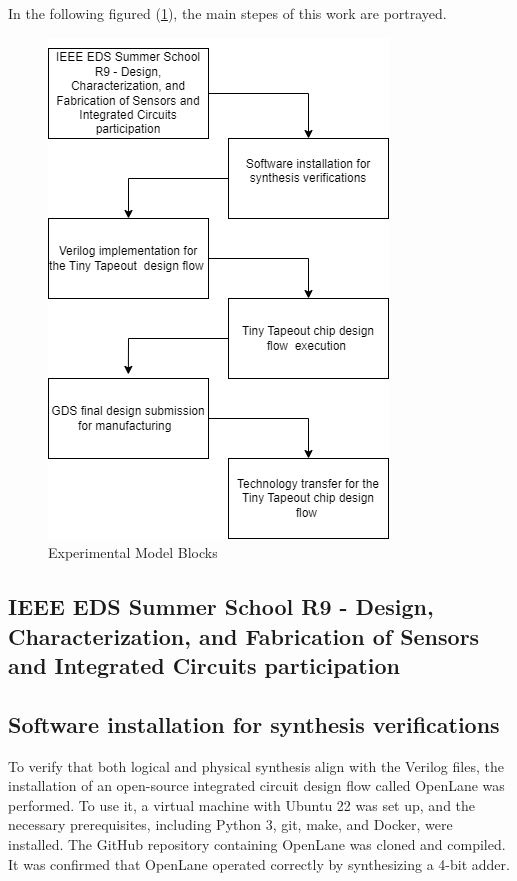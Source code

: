  In the following figured (\ref{fig:ExpModelBlocks}), the main stepes of this work are portrayed.
\begin{figure}[H]
    \centering
    \includegraphics[scale=0.6]{Pictures/ExperimentalModel.png}
    \caption{Experimental Model Blocks}
    \label{fig:ExpModelBlocks}
\end{figure}
\subsection{IEEE EDS Summer School R9 - Design, Characterization, and Fabrication of Sensors and Integrated Circuits participation}

\subsection{Software installation for synthesis verifications}

To verify that both logical and physical synthesis align with the Verilog files, the installation of an  open-source integrated circuit design flow called OpenLane was performed. To use it, a virtual machine with Ubuntu 22 was set up, and the necessary prerequisites, including Python 3, git, make, and Docker, were installed. The GitHub repository containing OpenLane was cloned and compiled. It was confirmed that OpenLane operated correctly by synthesizing a 4-bit adder.
 

